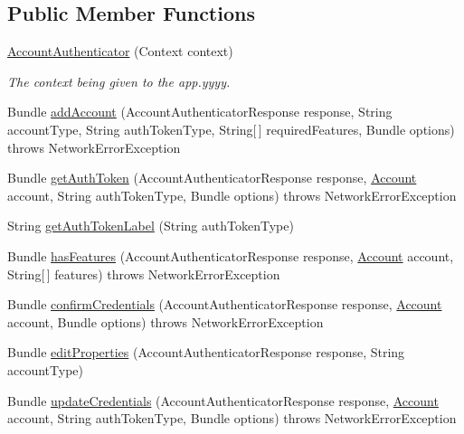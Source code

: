 \subsection*{Public Member Functions}
\begin{DoxyCompactItemize}
\item 
\hyperlink{classuk_1_1ac_1_1swan_1_1digitaltrails_1_1accounts_1_1_account_authenticator_a1c28ced91dd2f8a2079ba29e87eaed33}{Account\+Authenticator} (Context context)
\begin{DoxyCompactList}\small\item\em The context being given to the app.\+yyyy. \end{DoxyCompactList}\item 
Bundle \hyperlink{classuk_1_1ac_1_1swan_1_1digitaltrails_1_1accounts_1_1_account_authenticator_a62d040eea7e079506fbf38faf8a10910}{add\+Account} (Account\+Authenticator\+Response response, String account\+Type, String auth\+Token\+Type, String\mbox{[}$\,$\mbox{]} required\+Features, Bundle options)  throws Network\+Error\+Exception 
\item 
Bundle \hyperlink{classuk_1_1ac_1_1swan_1_1digitaltrails_1_1accounts_1_1_account_authenticator_accf8b092de90a407d819f2e725caa435}{get\+Auth\+Token} (Account\+Authenticator\+Response response, \hyperlink{classuk_1_1ac_1_1swan_1_1digitaltrails_1_1components_1_1_account}{Account} account, String auth\+Token\+Type, Bundle options)  throws Network\+Error\+Exception 
\item 
String \hyperlink{classuk_1_1ac_1_1swan_1_1digitaltrails_1_1accounts_1_1_account_authenticator_aed5266720e65fd505ae9e1b49e770321}{get\+Auth\+Token\+Label} (String auth\+Token\+Type)
\item 
Bundle \hyperlink{classuk_1_1ac_1_1swan_1_1digitaltrails_1_1accounts_1_1_account_authenticator_a5d57d1e4676178d3301498ab3f3f4878}{has\+Features} (Account\+Authenticator\+Response response, \hyperlink{classuk_1_1ac_1_1swan_1_1digitaltrails_1_1components_1_1_account}{Account} account, String\mbox{[}$\,$\mbox{]} features)  throws Network\+Error\+Exception 
\item 
Bundle \hyperlink{classuk_1_1ac_1_1swan_1_1digitaltrails_1_1accounts_1_1_account_authenticator_a89fd74d24bd17c1e4b491a1e6cb472cb}{confirm\+Credentials} (Account\+Authenticator\+Response response, \hyperlink{classuk_1_1ac_1_1swan_1_1digitaltrails_1_1components_1_1_account}{Account} account, Bundle options)  throws Network\+Error\+Exception 
\item 
Bundle \hyperlink{classuk_1_1ac_1_1swan_1_1digitaltrails_1_1accounts_1_1_account_authenticator_ad0fb9e2c65c901e2c60591943b25a0a4}{edit\+Properties} (Account\+Authenticator\+Response response, String account\+Type)
\item 
Bundle \hyperlink{classuk_1_1ac_1_1swan_1_1digitaltrails_1_1accounts_1_1_account_authenticator_a2b9b07cf976fa45eda1380afe84c3b84}{update\+Credentials} (Account\+Authenticator\+Response response, \hyperlink{classuk_1_1ac_1_1swan_1_1digitaltrails_1_1components_1_1_account}{Account} account, String auth\+Token\+Type, Bundle options)  throws Network\+Error\+Exception 
\end{DoxyCompactItemize}



